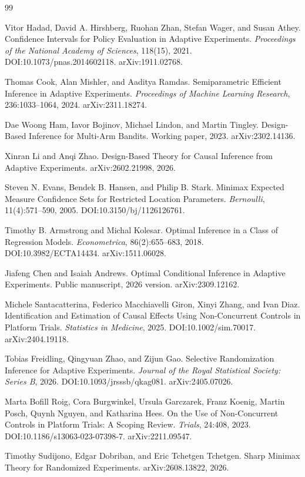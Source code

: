 \documentclass{article}
\begin{document}
\begin{thebibliography}{99}

   Vitor Hadad, David A. Hirshberg, Ruohan Zhan, Stefan Wager, and Susan Athey. Confidence Intervals for Policy Evaluation in Adaptive Experiments. \emph{Proceedings of the National Academy of Sciences}, 118(15), 2021. DOI:10.1073/pnas.2014602118. arXiv:1911.02768.

   Thomas Cook, Alan Mishler, and Aaditya Ramdas. Semiparametric Efficient Inference in Adaptive Experiments. \emph{Proceedings of Machine Learning Research}, 236:1033--1064, 2024. arXiv:2311.18274.

   Dae Woong Ham, Iavor Bojinov, Michael Lindon, and Martin Tingley. Design-Based Inference for Multi-Arm Bandits. Working paper, 2023. arXiv:2302.14136.

   Xinran Li and Anqi Zhao. Design-Based Theory for Causal Inference from Adaptive Experiments. arXiv:2602.21998, 2026.

   Steven N. Evans, Bendek B. Hansen, and Philip B. Stark. Minimax Expected Measure Confidence Sets for Restricted Location Parameters. \emph{Bernoulli}, 11(4):571--590, 2005. DOI:10.3150/bj/1126126761.

   Timothy B. Armstrong and Michal Kolesar. Optimal Inference in a Class of Regression Models. \emph{Econometrica}, 86(2):655--683, 2018. DOI:10.3982/ECTA14434. arXiv:1511.06028.

   Jiafeng Chen and Isaiah Andrews. Optimal Conditional Inference in Adaptive Experiments. Public manuscript, 2026 version. arXiv:2309.12162.

   Michele Santacatterina, Federico Macchiavelli Giron, Xinyi Zhang, and Ivan Diaz. Identification and Estimation of Causal Effects Using Non-Concurrent Controls in Platform Trials. \emph{Statistics in Medicine}, 2025. DOI:10.1002/sim.70017. arXiv:2404.19118.

   Tobias Freidling, Qingyuan Zhao, and Zijun Gao. Selective Randomization Inference for Adaptive Experiments. \emph{Journal of the Royal Statistical Society: Series B}, 2026. DOI:10.1093/jrsssb/qkag081. arXiv:2405.07026.

   Marta Bofill Roig, Cora Burgwinkel, Ursula Garczarek, Franz Koenig, Martin Posch, Quynh Nguyen, and Katharina Hees. On the Use of Non-Concurrent Controls in Platform Trials: A Scoping Review. \emph{Trials}, 24:408, 2023. DOI:10.1186/s13063-023-07398-7. arXiv:2211.09547.

   Timothy Sudijono, Edgar Dobriban, and Eric Tchetgen Tchetgen. Sharp Minimax Theory for Randomized Experiments. arXiv:2608.13822, 2026.

\end{thebibliography}
\end{document}
